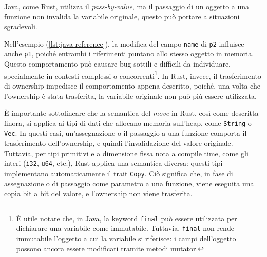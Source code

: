 Java, come Rust, utilizza il \textit{pass-by-value}, ma il passaggio di un oggetto a una funzione non invalida la variabile originale, questo può portare a situazioni sgradevoli.
Nell'esempio (\ref{lst:java-reference}), la modifica del campo \texttt{name} di \texttt{p2} influisce anche \texttt{p1}, poiché entrambi i riferimenti puntano allo stesso oggetto in memoria. Questo comportamento può causare bug sottili e difficili da individuare, specialmente in contesti complessi o concorrenti\footnote{È utile notare che, in Java, la keyword \texttt{final} può essere utilizzata per dichiarare una variabile come immutabile. Tuttavia, \texttt{final} non rende immutabile l'oggetto a cui la variabile si riferisce: i campi dell'oggetto possono ancora essere modificati tramite metodi mutator.}. In Rust, invece, il trasferimento di ownership impedisce il comportamento appena descritto, poiché, una volta che l'ownership è stata trasferita, la variabile originale non può più essere utilizzata.

È importante sottolineare che la semantica del \textit{move} in Rust, così come descritta finora, si applica ai tipi di dati che allocano memoria sull'heap, come \texttt{String} o \texttt{Vec}. In questi casi, un'assegnazione o il passaggio a una funzione comporta il trasferimento dell'ownership, e quindi l'invalidazione del valore originale. Tuttavia, per tipi primitivi e a dimensione fissa nota a compile time, come gli interi (\texttt{i32}, \texttt{u64}, etc.), Rust applica una semantica diversa: questi tipi implementano automaticamente il trait \texttt{Copy}. Ciò significa che, in fase di assegnazione o di passaggio come parametro a una funzione, viene eseguita una copia bit a bit del valore, e l'ownership non viene trasferita.

